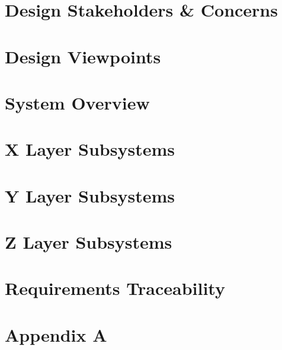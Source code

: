 \documentclass[11pt,letterpaper]{article}
\begin{document}
\section{Design Stakeholders \& Concerns}

\newpage
\section{Design Viewpoints}

\newpage
\section{System Overview}

\newpage
\section{X Layer Subsystems}

\newpage
\section{Y Layer Subsystems}

\newpage
\section{Z Layer Subsystems}

\newpage
\section{Requirements Traceability}

\newpage
\section{Appendix A}

\newpage


{}
\end{document}

